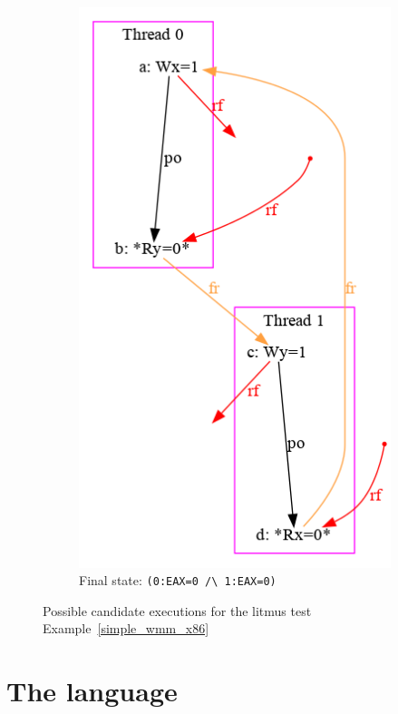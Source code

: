 \begin{figure}[H]
\begin{subfigure}[t]{.23\textwidth}
  \includegraphics[width=.9\linewidth]{img/my/sb-example/SB-dot-4.png}
  \caption{Final state: \texttt{(0:EAX=0~/\textbackslash~1:EAX=0)}}
  \label{simple_wmm_x86_pic:sub4}
\end{subfigure}
\hfill
\caption{Possible candidate executions for the litmus test Example~\ref{simple_wmm_x86}}
\label{simple_wmm_x86_pic}
\end{figure}


\section{The \cat language}
\label{ch:wmm:cat}

